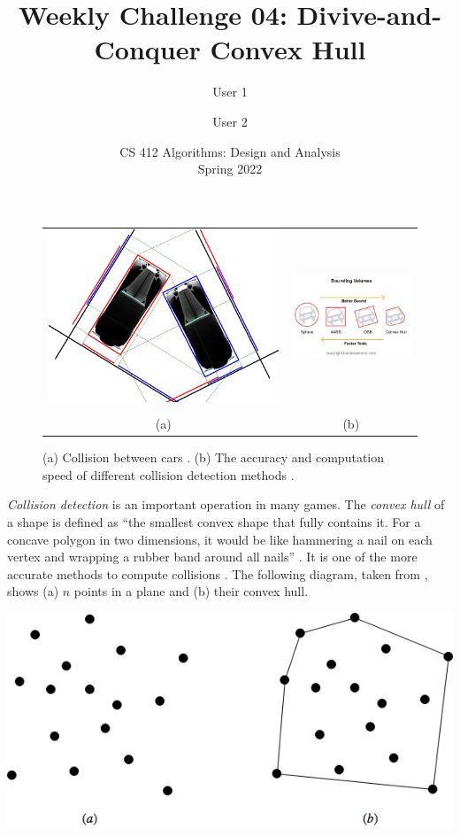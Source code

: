 \documentclass[a4paper]{exam}
\title{Weekly Challenge 04: Divive-and-Conquer Convex Hull}
\author{User 1 \and User 2}  %
\date{CS 412 Algorithms: Design and Analysis\\Spring 2022}
\begin{document}
\maketitle

\begin{questions}

  \begin{figure}[h]
    \begin{tabularx}{\textwidth}{cc}
    \includegraphics[width=.45\textwidth]{collisionDetect500}
      &
      \includegraphics[width=.45\textwidth]{methods}\\
      \\
      (a) & (b)
    \end{tabularx}
    \caption{(a) Collision between cars \cite{collision}. (b) The accuracy and computation speed of different collision detection methods \cite{tips}.}
    \label{fig:methods}
  \end{figure}
  
\question \textit{Collision detection} is an important operation in many games. The \textit{convex hull} of a shape is defined as ``the smallest convex shape that fully contains it. For a concave polygon in two dimensions, it would be like hammering a nail on each vertex and wrapping a rubber band around all nails'' \cite{physics}. It is one of the more accurate methods to compute collisions \cite{tips}. The following diagram, taken from \cite{jarvis}, shows (a) $n$ points in a plane and (b) their convex hull.
  
  \centerline{\includegraphics[width=.6\textwidth]{hull}}


\end{questions}
\end{document}
